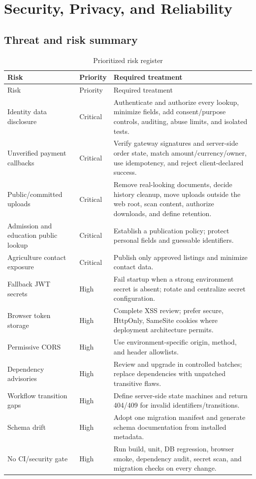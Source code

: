 \documentclass[12pt,a4paper,oneside]{report}
\begin{document}
\chapter{Security, Privacy, and Reliability}

\section{Threat and risk summary}

\begin{longtable}{@{}p{} p{} p{}@{}}
\caption{Prioritized risk register}\label{tab:risks}\\
\toprule
Risk & Priority & Required treatment\\
\midrule
\endfirsthead
\toprule
Risk & Priority & Required treatment\\
\midrule
\endhead
Identity data disclosure & Critical & Authenticate and authorize every lookup, minimize fields, add consent/purpose controls, auditing, abuse limits, and isolated tests.\\
Unverified payment callbacks & Critical & Verify gateway signatures and server-side order state, match amount/currency/owner, use idempotency, and reject client-declared success.\\
Public/committed uploads & Critical & Remove real-looking documents, decide history cleanup, move uploads outside the web root, scan content, authorize downloads, and define retention.\\
Admission and education public lookup & Critical & Establish a publication policy; protect personal fields and guessable identifiers.\\
Agriculture contact exposure & Critical & Publish only approved listings and minimize contact data.\\
Fallback JWT secrets & High & Fail startup when a strong environment secret is absent; rotate and centralize secret configuration.\\
Browser token storage & High & Complete XSS review; prefer secure, HttpOnly, SameSite cookies where deployment architecture permits.\\
Permissive CORS & High & Use environment-specific origin, method, and header allowlists.\\
Dependency advisories & High & Review and upgrade in controlled batches; replace dependencies with unpatched transitive flaws.\\
Workflow transition gaps & High & Define server-side state machines and return 404/409 for invalid identifiers/transitions.\\
Schema drift & High & Adopt one migration manifest and generate schema documentation from installed metadata.\\
No CI/security gate & High & Run build, unit, DB regression, browser smoke, dependency audit, secret scan, and migration checks on every change.\\
\bottomrule
\end{longtable}
\end{document}
